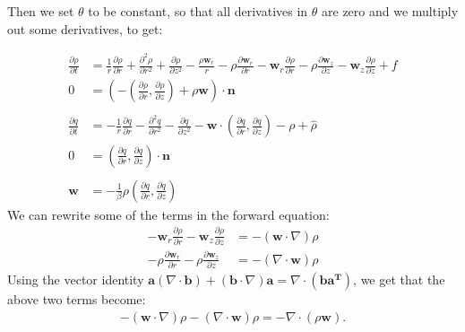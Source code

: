 \documentclass[11pt, a4paper]{article}
\theoremstyle{definition}
\newcommand{\w}{\mathbf{w}}
\newcommand{\n}{\mathbf{n}}
\newcommand{\hr}{\widehat \rho}
\begin{document}
Then we set $\theta$ to be constant, so that all derivatives in $\theta$ are zero and we multiply out some derivatives, to get:

\begin{align*}
	\frac{\partial \rho}{\partial t} &= \frac{1}{r} \frac{\partial \rho}{\partial r} +  \frac{\partial^2 \rho}{\partial r^2} + \frac{\partial \rho}{\partial z^2} - \frac{\rho\w_r}{r} -\rho\frac{\partial \w_r }{\partial r} -\w_r\frac{\partial \rho}{\partial r} - \rho\frac{\partial \w_z}{\partial z}- \w_z\frac{\partial \rho}{\partial z} + f\\
	0 &= \left(- \left(\frac{\partial \rho}{\partial r},  \frac{\partial \rho}{\partial z}\right) + \rho \w \right) \cdot \n \\
	\\
	\frac{\partial q}{\partial t} &= - \frac{1}{r} \frac{\partial q}{\partial r} -  \frac{\partial^2 q}{\partial r^2} - \frac{\partial q}{\partial z^2} - \w \cdot \left(\frac{\partial q}{\partial r},  \frac{\partial q}{\partial z}\right) - \rho + \hr\\
	0 &= \left(\frac{\partial q}{\partial r},  \frac{\partial q}{\partial z}\right) \cdot \n \\
	\\
	\w &= - \frac{1}{\beta}\rho  \left(\frac{\partial q}{\partial r},  \frac{\partial q}{\partial z}\right)
\end{align*}
We can rewrite some of the terms in the forward equation:
\begin{align*}
	-\w_r\frac{\partial \rho}{\partial r} - \w_z\frac{\partial \rho}{\partial z} &= - \left(\w \cdot \nabla \right)\rho\\
	-\rho\frac{\partial \w_r }{\partial r} - \rho\frac{\partial \w_z}{\partial z} &= -\left(\nabla \cdot \w \right)\rho 
\end{align*}
Using the vector identity $\mathbf a (\nabla \cdot \mathbf b) + (\mathbf b \cdot \nabla ) \mathbf a = \nabla \cdot (\mathbf{b a^T})$, we get that the above two terms become:
\begin{align*}
	- \left(\w \cdot \nabla \right)\rho - \left(\nabla \cdot \w \right)\rho = - \nabla \cdot (\rho\w ).
\end{align*}
\end{document}
